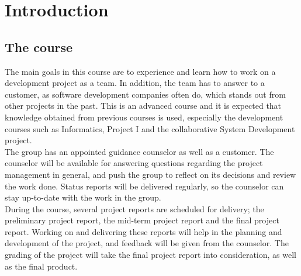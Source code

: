 \chapter{Introduction}
\section{The course}
										
The main goals in this course are to experience and learn how to work on a 
development project as a team. In addition, the team has to answer to a 
customer, as software development companies often do, which stands out from 
other projects in the past. This is an advanced course and it is expected that 
knowledge obtained from previous courses is used, especially the development 
courses such as Informatics, Project I and the collaborative System Development 
project. \\

The group has an appointed guidance counselor as well as a customer. The 
counselor will be available for answering questions regarding the project 
management in general, and push the group to reflect on its decisions and 
review the work done. Status reports will be delivered regularly, so the 
counselor can stay up-to-date with the work in the group. \\

During the course, several project reports are scheduled for delivery; the 
preliminary project report, the mid-term project report and the final project 
report. Working on and delivering these reports will help in the planning and 
development of the project, and feedback will be given from the counselor. The 
grading of the project will take the final project report into consideration, 
as well as the final product.\\

